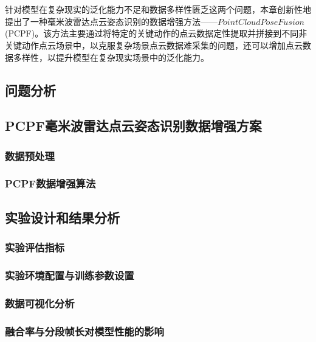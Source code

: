 \chapter{}
针对模型在复杂现实的泛化能力不足和数据多样性匮乏这两个问题，本章创新性地提出了一种毫米波雷达点云姿态识别的数据增强方法——$PointCloud PoseFusion$(PCPF)。该方法主要通过将特定的关键动作的点云数据定性提取并拼接到不同非关键动作点云场景中，以克服复杂场景点云数据难采集的问题，还可以增加点云数据多样性，以提升模型在复杂现实场景中的泛化能力。


\section{问题分析}
\section{PCPF毫米波雷达点云姿态识别数据增强方案}

\subsection{数据预处理}
\subsection{PCPF数据增强算法}



\section{实验设计和结果分析}
\subsection{实验评估指标}
\subsection{实验环境配置与训练参数设置}
\subsection{数据可视化分析}
\subsection{融合率与分段帧长对模型性能的影响}



